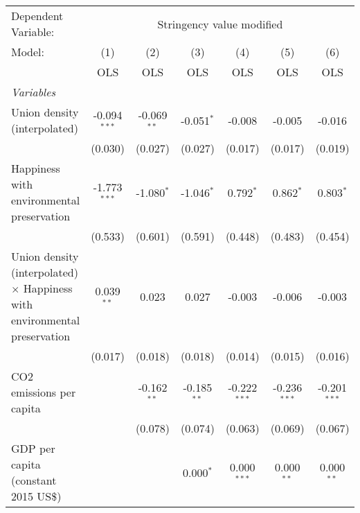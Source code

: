 
\begingroup
\centering
\begin{tabular}{lcccccc}
   \toprule
   Dependent Variable: & \multicolumn{6}{c}{Stringency value modified}\\
   Model:                                                                           & (1)            & (2)           & (3)           & (4)            & (5)            & (6)\\  
                                                                                    &  OLS           & OLS           & OLS           & OLS            & OLS            & OLS\\  
   \midrule
   \emph{Variables}\\
   Union density (interpolated)                                                     & -0.094$^{***}$ & -0.069$^{**}$ & -0.051$^{*}$  & -0.008         & -0.005         & -0.016\\   
                                                                                    & (0.030)        & (0.027)       & (0.027)       & (0.017)        & (0.017)        & (0.019)\\   
   Happiness with environmental preservation                                        & -1.773$^{***}$ & -1.080$^{*}$  & -1.046$^{*}$  & 0.792$^{*}$    & 0.862$^{*}$    & 0.803$^{*}$\\   
                                                                                    & (0.533)        & (0.601)       & (0.591)       & (0.448)        & (0.483)        & (0.454)\\   
   Union density (interpolated) $\times$ Happiness with environmental preservation  & 0.039$^{**}$   & 0.023         & 0.027         & -0.003         & -0.006         & -0.003\\   
                                                                                    & (0.017)        & (0.018)       & (0.018)       & (0.014)        & (0.015)        & (0.016)\\   
   CO2 emissions per capita                                                         &                & -0.162$^{**}$ & -0.185$^{**}$ & -0.222$^{***}$ & -0.236$^{***}$ & -0.201$^{***}$\\   
                                                                                    &                & (0.078)       & (0.074)       & (0.063)        & (0.069)        & (0.067)\\   
   GDP per capita (constant 2015 US\$)                                              &                &               & 0.000$^{*}$   & 0.000$^{***}$  & 0.000$^{**}$   & 0.000$^{**}$\\   

\end{tabular}
